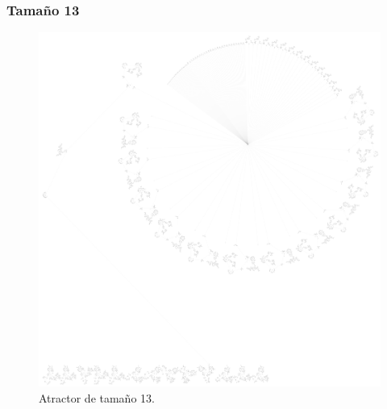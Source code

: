 \documentclass[11pt]{article}
\begin{document}
			\subsubsection{Tamaño 13}
			\begin{figure}[H]
			\centering
			\includegraphics[scale=0.15]{resources/Atractores22/atractor_22_size_13.png}
			\caption{Atractor de tamaño 13.}\label{fig:picture}
			\end{figure}
\end{document}
